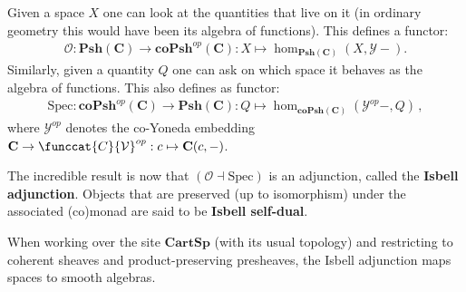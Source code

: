     \begin{property}
        Given a space $X$ one can look at the quantities that live on it (in ordinary geometry this would have been its algebra of functions). This defines a functor:
        \begin{gather}
            \mathcal{O}:\mathbf{Psh(C)}\rightarrow\mathbf{coPsh}^{op}(\mathbf{C}):X\mapsto\hom_\mathbf{Psh(C)}(X,\mathcal{Y}-).
        \end{gather}
        Similarly, given a quantity $Q$ one can ask on which space it behaves as the algebra of functions. This also defines as functor:
        \begin{gather}
            \mathrm{Spec}:\mathbf{coPsh}^{op}(\mathbf{C})\rightarrow\mathbf{Psh(C)}:Q\mapsto\hom_\mathbf{coPsh(C)}(\mathcal{Y}^{op}-,Q)\,,
        \end{gather}
        where $\mathcal{Y}^{op}$ denotes the co-Yoneda embedding $\mathbf{C}\rightarrow\funccat{C}{\mathcal{V}}^{op}:c\mapsto\mathbf{C}(c,-)$.

        The incredible result is now that $(\mathcal{O}\dashv\text{Spec})$ is an adjunction, called the \textbf{Isbell adjunction}. Objects that are preserved (up to isomorphism) under the associated (co)monad are said to be \textbf{Isbell self-dual}.
    \end{property}
    \begin{example}
        When working over the site $\mathbf{CartSp}$ (with its usual topology) and restricting to coherent sheaves and product-preserving presheaves, the Isbell adjunction maps spaces to smooth algebras.
    \end{example}